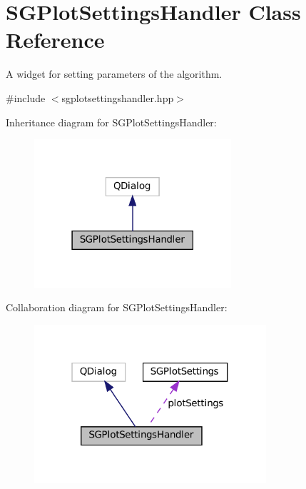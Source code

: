 \hypertarget{classSGPlotSettingsHandler}{}\section{S\+G\+Plot\+Settings\+Handler Class Reference}
\label{classSGPlotSettingsHandler}


A widget for setting parameters of the algorithm.  




{\ttfamily \#include $<$sgplotsettingshandler.\+hpp$>$}



Inheritance diagram for S\+G\+Plot\+Settings\+Handler\+:
\nopagebreak
\begin{figure}[H]
\begin{center}
\leavevmode
\includegraphics[width=207pt]{classSGPlotSettingsHandler__inherit__graph}
\end{center}
\end{figure}


Collaboration diagram for S\+G\+Plot\+Settings\+Handler\+:
\nopagebreak
\begin{figure}[H]
\begin{center}
\leavevmode
\includegraphics[width=244pt]{classSGPlotSettingsHandler__coll__graph}
\end{center}
\end{figure}
